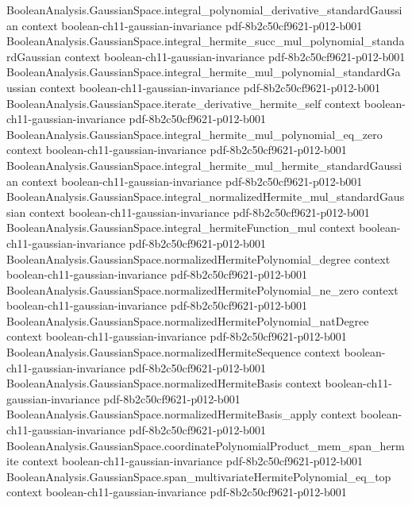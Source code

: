 \begin{theorem}
\proofstep
  {BooleanAnalysis.GaussianSpace.integral_polynomial_derivative_standardGaussian}
  {context}
  {boolean-ch11-gaussian-invariance}
  {pdf-8b2c50cf9621-p012-b001}
\proofstep
  {BooleanAnalysis.GaussianSpace.integral_hermite_succ_mul_polynomial_standardGaussian}
  {context}
  {boolean-ch11-gaussian-invariance}
  {pdf-8b2c50cf9621-p012-b001}
\proofstep
  {BooleanAnalysis.GaussianSpace.integral_hermite_mul_polynomial_standardGaussian}
  {context}
  {boolean-ch11-gaussian-invariance}
  {pdf-8b2c50cf9621-p012-b001}
\proofstep
  {BooleanAnalysis.GaussianSpace.iterate_derivative_hermite_self}
  {context}
  {boolean-ch11-gaussian-invariance}
  {pdf-8b2c50cf9621-p012-b001}
\proofstep
  {BooleanAnalysis.GaussianSpace.integral_hermite_mul_polynomial_eq_zero}
  {context}
  {boolean-ch11-gaussian-invariance}
  {pdf-8b2c50cf9621-p012-b001}
\proofstep
  {BooleanAnalysis.GaussianSpace.integral_hermite_mul_hermite_standardGaussian}
  {context}
  {boolean-ch11-gaussian-invariance}
  {pdf-8b2c50cf9621-p012-b001}
\proofstep
  {BooleanAnalysis.GaussianSpace.integral_normalizedHermite_mul_standardGaussian}
  {context}
  {boolean-ch11-gaussian-invariance}
  {pdf-8b2c50cf9621-p012-b001}
\proofstep
  {BooleanAnalysis.GaussianSpace.integral_hermiteFunction_mul}
  {context}
  {boolean-ch11-gaussian-invariance}
  {pdf-8b2c50cf9621-p012-b001}
\proofstep
  {BooleanAnalysis.GaussianSpace.normalizedHermitePolynomial_degree}
  {context}
  {boolean-ch11-gaussian-invariance}
  {pdf-8b2c50cf9621-p012-b001}
\proofstep
  {BooleanAnalysis.GaussianSpace.normalizedHermitePolynomial_ne_zero}
  {context}
  {boolean-ch11-gaussian-invariance}
  {pdf-8b2c50cf9621-p012-b001}
\proofstep
  {BooleanAnalysis.GaussianSpace.normalizedHermitePolynomial_natDegree}
  {context}
  {boolean-ch11-gaussian-invariance}
  {pdf-8b2c50cf9621-p012-b001}
\proofstep
  {BooleanAnalysis.GaussianSpace.normalizedHermiteSequence}
  {context}
  {boolean-ch11-gaussian-invariance}
  {pdf-8b2c50cf9621-p012-b001}
\proofstep
  {BooleanAnalysis.GaussianSpace.normalizedHermiteBasis}
  {context}
  {boolean-ch11-gaussian-invariance}
  {pdf-8b2c50cf9621-p012-b001}
\proofstep
  {BooleanAnalysis.GaussianSpace.normalizedHermiteBasis_apply}
  {context}
  {boolean-ch11-gaussian-invariance}
  {pdf-8b2c50cf9621-p012-b001}
\proofstep
  {BooleanAnalysis.GaussianSpace.coordinatePolynomialProduct_mem_span_hermite}
  {context}
  {boolean-ch11-gaussian-invariance}
  {pdf-8b2c50cf9621-p012-b001}
\proofstep
  {BooleanAnalysis.GaussianSpace.span_multivariateHermitePolynomial_eq_top}
  {context}
  {boolean-ch11-gaussian-invariance}
  {pdf-8b2c50cf9621-p012-b001}

\end{theorem}
